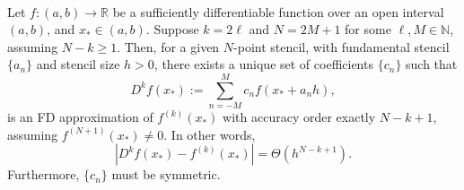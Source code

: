 \documentclass[12pt]{article}
\newcommand{\N}{\mathbb{N}}
\newcommand{\R}{\mathbb{R}}
\newcommand{\xstar}{x_*}
\newcommand{\FD}{D}
\begin{document}
%
\begin{theorem} \label{thm:SCeven}
\\
Let $f:(a,b)\to\R$ be a sufficiently differentiable function over an open interval $(a,b)$, and $\xstar\in(a,b)$. 
Suppose $k=2\ell$ and $N=2M+1$ for some $\ell, M \in \N$, assuming $N-k\ge 1$. 
Then, for a given $N$-point stencil, with fundamental stencil $\{a_n\}$ and stencil size $h>0$, there exists a unique set of coefficients $\{c_n\}$ such that 
\begin{equation}\label{eq:FD_Nodd}
	\FD^k f(\xstar) := \sum_{n=-M}^Mc_nf(\xstar+a_nh ),
\end{equation}
is an FD approximation of $f^{(k)}(\xstar)$ with accuracy order exactly $N-k+1$, assuming $f^{(N+1)}(\xstar)\neq 0$.
In other words, 
\[
	\left| \FD^k f(\xstar) - f^{(k)}(\xstar) \right| = \Theta(h^{N-k+1}).
\]
Furthermore, $\{c_n\}$ must be symmetric.
\end{theorem}
%
\end{document}
